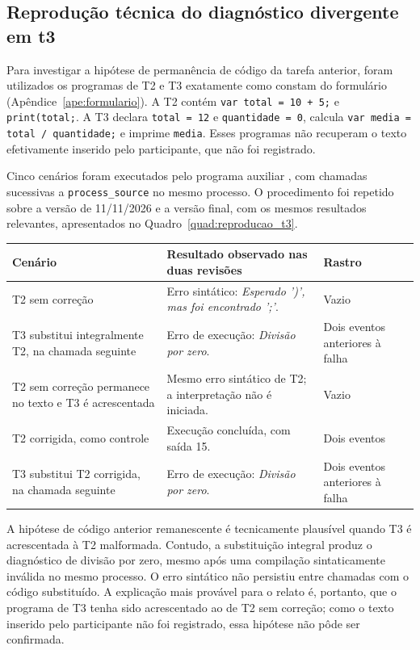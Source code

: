 \subsection{Reprodução técnica do diagnóstico divergente em t3}
\label{sec:reproducao_t3}

Para investigar a hipótese de permanência de código da tarefa anterior, foram
utilizados os programas de T2 e T3 exatamente como constam do formulário
(Apêndice~\ref{ape:formulario}). A T2 contém \texttt{var total = 10 + 5;} e
\texttt{print(total;}. A T3 declara \texttt{total = 12} e \texttt{quantidade = 0},
calcula \texttt{var media = total / quantidade;} e imprime \texttt{media}.
Esses programas não recuperam o texto efetivamente inserido pelo participante,
que não foi registrado.

Cinco cenários foram executados pelo programa auxiliar
, com chamadas sucessivas a
\texttt{process\_source} no mesmo processo. O procedimento foi repetido sobre
a versão de 11/11/2026 e a versão final, com os mesmos
resultados relevantes, apresentados no Quadro~\ref{quad:reproducao_t3}.

\begin{quadro}[htb]
\centering
{}
\footnotesize
\begin{tabular}{|P{4.4cm}|P{5.6cm}|P{2.8cm}|}
\hline
Cenário & Resultado observado nas duas revisões & Rastro \\
\hline\hline
T2 sem correção & Erro sintático: \textit{Esperado ')', mas foi encontrado ';'}. & Vazio \\
\hline
T3 substitui integralmente T2, na chamada seguinte & Erro de execução: \textit{Divisão por zero}. & Dois eventos anteriores à falha \\
\hline
T2 sem correção permanece no texto e T3 é acrescentada & Mesmo erro sintático de T2; a interpretação não é iniciada. & Vazio \\
\hline
T2 corrigida, como controle & Execução concluída, com saída 15. & Dois eventos \\
\hline
T3 substitui T2 corrigida, na chamada seguinte & Erro de execução: \textit{Divisão por zero}. & Dois eventos anteriores à falha \\
\hline
\end{tabular}
\vspace{0.2cm}
\end{quadro}
\FloatBarrier

A hipótese de código anterior remanescente é tecnicamente plausível quando T3 é
acrescentada à T2 malformada. Contudo, a substituição integral produz o diagnóstico
de divisão por zero, mesmo após uma compilação sintaticamente inválida no mesmo
processo. O erro sintático não persistiu entre chamadas com o código substituído. A explicação mais provável para o relato é, portanto, que o programa de T3 tenha sido acrescentado ao de T2 sem correção; como o texto inserido pelo participante não foi registrado, essa hipótese não pôde ser confirmada.
